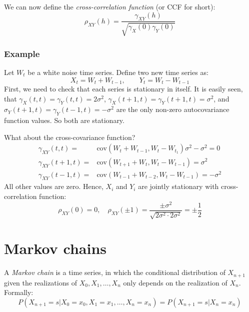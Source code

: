 \documentclass[12pt, a4paper]{article}
\numberwithin{equation}{section}
\begin{document}
We can now define the \textit{cross-correlation function} (or CCF for short):
\begin{equation}
\rho_{XY}(h)=\frac{\gamma_{XY}(h)}{\sqrt{\gamma_X(0)\gamma_Y(0)}}
\end{equation}

\subsubsection{Example}
Let $W_t$ be a white noise time series. Define two new time series as:
\begin{equation}
X_t=W_t+W_{t-1},\qquad Y_t=W_t-W_{t-1}
\end{equation}
First, we need to check that each series is stationary in itself. It is easily seen, that $\gamma_X(t,t)=\gamma_Y(t,t)=2\sigma^2$, $\gamma_X(t+1,t)=\gamma_Y(t+1,t)=\sigma^2$, and $\sigma_Y(t+1,t)=\gamma_Y(t-1,t)=-\sigma^2$ are the only non-zero autocovariance function values. So both are stationary.

What about the cross-covariance function?
\begin{align}
\gamma_{XY}(t,t)=&\textrm{cov}(W_t+W_{t-1},W_t-W_{t_1})\sigma^2-\sigma^2=0\\
\gamma_{XY}(t+1,t)=&\textrm{cov}(W_{t+1}+W_t,W_t-W_{t-1})=\sigma^2\\
\gamma_{XY}(t-1,t)=&\textrm{cov}(W_{t-1}+W_{t-2},W_t-W_{t-1})=-\sigma^2
\end{align}
All other values are zero. Hence, $X_i$ and $Y_i$ are jointly stationary with cross-correlation function:
\begin{equation}
\rho_{XY}(0)=0,\quad\rho_{XY}(\pm 1)=\frac{\pm\sigma^2}{\sqrt{2\sigma^2\cdot 2\sigma^2}}=\pm\frac{1}{2}
\end{equation}

\section{Markov chains}
A \textit{Markov chain} is a time series, in which the conditional distribution of $X_{n+1}$ given the realizations of $X_0, X_1,\ldots, X_n$ only depends on the realization of $X_n$. Formally:
\begin{equation}
P(X_{n+1}=s|X_0=x_0, X_1=x_1,\ldots, X_n=x_n)=P(X_{n+1}=s|X_n=x_n)
\end{equation}
\end{document}
